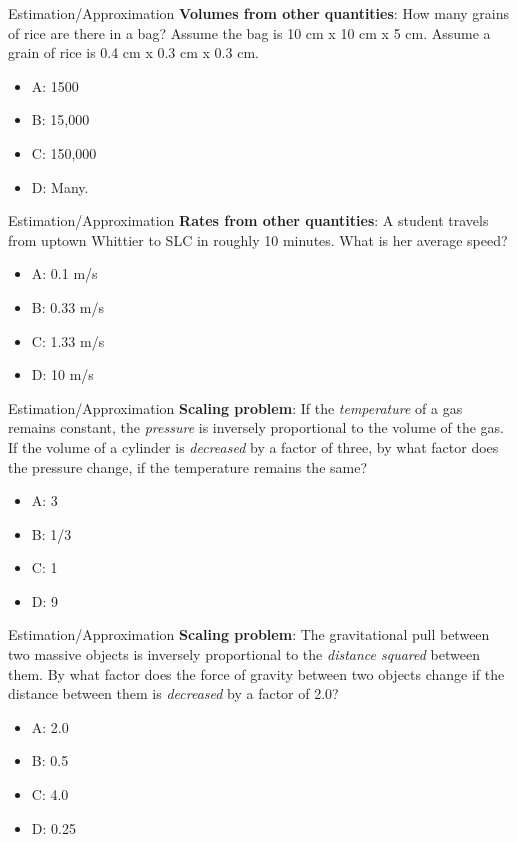 \documentclass{beamer}
\begin{document}
\begin{frame}{Estimation/Approximation}
\textbf{Volumes from other quantities}: How many grains of rice are there in a bag?  Assume the bag is 10 cm x 10 cm x 5 cm.  Assume a grain of rice is 0.4 cm x 0.3 cm x 0.3 cm.
\vspace{0.55cm}
\begin{itemize}
\item A: 1500
\item B: 15,000
\item C: 150,000
\item D: Many.
\end{itemize}
\end{frame}

\begin{frame}{Estimation/Approximation}
\textbf{Rates from other quantities}: A student travels from uptown Whittier to SLC in roughly 10 minutes.  What is her average speed?
\begin{itemize}
\item A: 0.1 m/s
\item B: 0.33 m/s
\item C: 1.33 m/s
\item D: 10 m/s
\end{itemize}
\end{frame}

\begin{frame}{Estimation/Approximation}
\textbf{Scaling problem}: If the \textit{temperature} of a gas remains constant, the \textit{pressure} is inversely proportional to the volume of the gas.  If the volume of a cylinder is \textit{decreased} by a factor of three, by what factor does the pressure change, if the temperature remains the same?
\begin{itemize}
\item A: 3
\item B: 1/3
\item C: 1
\item D: 9
\end{itemize}
\end{frame}

\begin{frame}{Estimation/Approximation}
\textbf{Scaling problem}: The gravitational pull between two massive objects is inversely proportional to the \textit{distance squared} between them.  By what factor does the force of gravity between two objects change if the distance between them is \textit{decreased} by a factor of 2.0?
\begin{itemize}
\item A: 2.0
\item B: 0.5
\item C: 4.0
\item D: 0.25
\end{itemize}
\end{frame}
\end{document}
